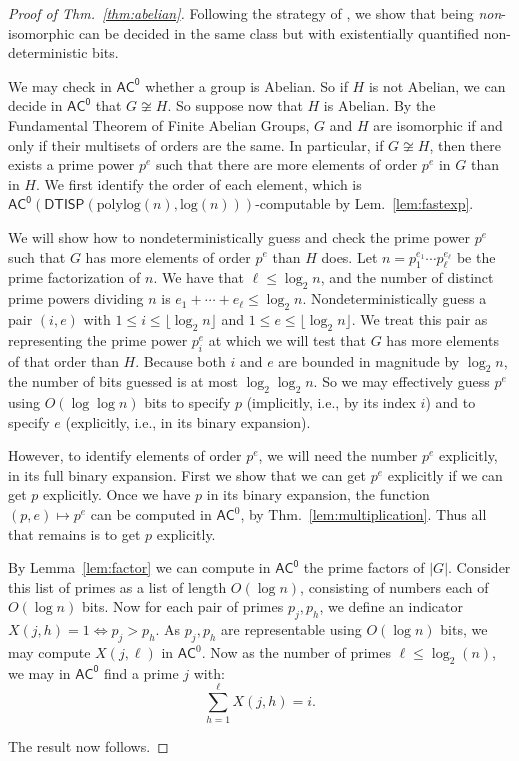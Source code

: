 \documentclass{theoretics}
\newcommand{\Lem}[1]{Lem.~\ref{#1}\xspace}
\newcommand{\Thm}[1]{Thm.~\ref{#1}\xspace}
\newcommand*{\ComplexityClass}[1]{\ensuremath{\mathsf{#1}}\xspace}
\newcommand{\DTISP}{\ComplexityClass{DTISP}}
\newcommand{\DTISPpll}{\ensuremath{\DTISP(\mathrm{polylog}(n),\mathrm{log}(n))}\xspace}
\newcommand{\ACz}{\ComplexityClass{AC^0}}
\begin{document}
\begin{proof}[Proof of \Thm{thm:abelian}]
Following the strategy of \cite[Theorem~7.15]{GrochowLevetWL}, we show that being \textit{non}-isomorphic can be decided in the same class but with existentially quantified non-deterministic bits. 

We may check in \ACz whether a group is Abelian. So if $H$ is not Abelian, we can decide in \ACz that $G \not \cong H$. So suppose now that $H$ is Abelian. By the Fundamental Theorem of Finite Abelian Groups, $G$ and $H$ are isomorphic if and only if their multisets of orders are the same. In particular, if $G \not \cong H$, then there exists a prime power $p^{e}$ such that there are more elements of order $p^{e}$ in $G$ than in $H$. We first identify the order of each element, which is $\ACz(\DTISPpll)$-computable by \Lem{lem:fastexp}.

We will show how to nondeterministically guess and check the prime power $p^e$ such that $G$ has more elements of order $p^e$ than $H$ does. Let $n = p_{1}^{e_{1}} \cdots p_{\ell}^{e_{\ell}}$ be the prime factorization of $n$. We have that $\ell \leq \log_{2} n$, and the number of distinct prime powers dividing $n$ is $e_{1} + \cdots + e_{\ell} \leq \log_{2} n$. Nondeterministically guess a pair $(i,e)$ with $1 \leq i \leq \lfloor \log_2 n \rfloor$ and $1 \leq e \leq \lfloor \log_2 n \rfloor$. We treat this pair as representing the prime power $p_i^e$ at which we will test that $G$ has more elements of that order than $H$. Because both $i$ and $e$ are bounded in magnitude by $\log_2 n$, the number of bits guessed is at most $\log_2 \log_2 n$. So we may effectively guess $p^{e}$ using $O(\log \log n)$ bits to specify $p$ (implicitly, i.e., by its index $i$) and to specify $e$ (explicitly, i.e., in its binary expansion). 

However, to identify elements of order $p^e$, we will need the number $p^e$ explicitly, in its full binary expansion. First we show that we can get $p^e$ explicitly if we can get $p$ explicitly. Once we have $p$ in its binary expansion, the function $(p,e) \mapsto p^e$ can be computed in $\mathsf{AC}^0$, by \Thm{lem:multiplication}. 
Thus all that remains is to get $p$ explicitly. 



By Lemma~\ref{lem:factor} we can compute in \ACz the prime factors of $|G|$. Consider this list of primes as a list of length $O(\log n)$, consisting of numbers each of $O(\log n)$ bits. Now for each pair of primes $p_{j}, p_{h}$, we define an indicator $X(j,h) = 1 \iff p_{j} > p_{h}$. As $p_{j}, p_{h}$ are representable using $O(\log n)$ bits, we may compute $X(j, \ell)$ in $\mathsf{AC}^{0}$. Now as the number of primes $\ell \leq \log_{2}(n)$, we may in $\ACz$ find a prime $j$ with:
\[
\sum_{h=1}^{\ell} X(j,h) = i.
\]

\noindent The result now follows. 
\end{proof}
\end{document}
